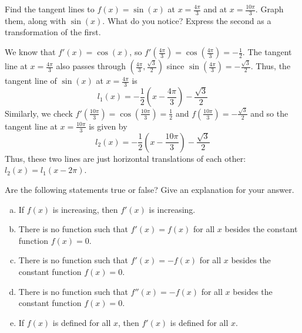 \documentclass[11pt]{exam}
\begin{document}
\begin{questions}
    \vspace{1em}
  \question Find the tangent lines to $f(x)=\sin(x)$ at $x=\frac{4\pi}{3}$  and at $x=\frac{10\pi}{3}$.  Graph them, along with $\sin(x)$.  What do you notice?  Express the second as a transformation of the first.
    \begin{solution}
      We know that \(f'(x) = \cos(x)\), so \(f'\left( \frac{4\pi}{3}
      \right) = \cos\left(\frac{4\pi}{3}\right) =
      -\frac{1}{2}\). The tangent line at \(x=\frac{4\pi}{3}\) also
      passes through \((\frac{4\pi}{3}, \frac{\sqrt{3}}{2})\) since
      \(\sin\left(\frac{4\pi}{3}\right) = -\frac{\sqrt{3}}{2}\). Thus, the
      tangent line of \(\sin(x)\) at \(x = \frac{4\pi}{3}\) is \[
        l_1(x) = -\frac{1}{2}\left(x-\frac{4\pi}{3}\right)-\frac{\sqrt{3}}{2}
      \]
      Similarly, we check \(f'\left( \frac{10\pi}{3} \right) = \cos\left(\frac{10\pi}{3}\right) =
      \frac{1}{2}\) and \(f\left( \frac{10\pi}{3} \right) =
      -\frac{\sqrt{3}}{2}\) and so the tangent line at
      \(x=\frac{10\pi}{3}\) is given by \[
        l_2(x) = -\frac{1}{2}\left(x-\frac{10\pi}{3}\right)-\frac{\sqrt{3}}{2}
      \]
      Thus, these two lines are just horizontal translations of each
      other: \(l_2(x) = l_1(x-2\pi)\).
    \end{solution}
    \vspace{1em}
  \question Are the following statements true or false? Give an explanation for your answer.
\begin{enumerate}[(a)]
	\item If $f(x)$ is increasing, then $f'(x)$ is increasing.
	\item There is no function such that $f'(x) = f(x)$ for all $x$ besides the constant function $f(x)=0$.
	\item There is no function such that $f'(x) = -f(x)$ for all $x$ besides the constant function $f(x)=0$.
	\item There is no function such that $f''(x) = -f(x)$ for all $x$ besides the constant function $f(x)=0$.
	\item If $f(x)$ is defined for all $x$, then $f'(x)$ is defined for all $x$.
\end{enumerate}
\begin{solution}
\end{solution}
\end{questions}
\end{document}
